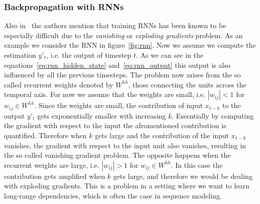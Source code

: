 \subsubsection{Backpropagation with RNNs}
Also in~\cite{rnn_survey} the authors mention that training RNNs has been known to be especially difficult due to the \emph{vanishing} or \emph{exploding gradients} problem.
As an example we consider the RNN in figure~\ref{fig:rnn}.
Now we assume we compute the estimation $y'_t$, i.e. the output of timestep $t$.
As we can see in the equations~\ref{eq:rnn_hidden_state} and~\ref{eq:rnn_output} this output is also influenced by all the previous timesteps.
The problem now arises from the so called recurrent weights denoted by $W^{hh}$, those connecting the units across the temporal axis.
For now we assume that the weights are small, i.e. $|w_{ij}| < 1$ for $w_{ij} \in W^{hh}$.
Since the weights are small, the contribution of input $x_{t-k}$ to the output $y'_t$ gets exponentially smaller with increasing $k$.
Essentially by computing the gradient with respect to the input the afromentioned contribution is quantified.
Therefore when $k$ gets large and the contribution of the input $x_{t-k}$ vanishes, the gradient with respect to the input unit also vanishes, resulting in the so called vanishing gradient problem.
The opposite happens when the recurrent weights are large, i.e. $|w_{ij}| > 1$ for $w_{ij} \in W^{hh}$.
In this case the contribution gets amplified when $k$ gets large, and therefore we would be dealing with exploding gradients.
This is a problem in a setting where we want to learn long-range dependencies, which is often the case in sequence modeling.

